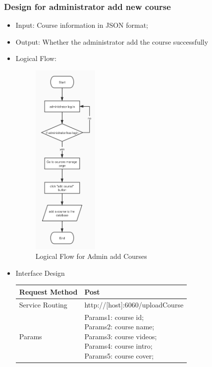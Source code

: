 \documentclass[16pt]{scrreprt}
\begin{document}
\subsubsection{Design for administrator add new course}
\begin{itemize}
    \item Input: Course information in JSON format; 
    \item Output: Whether the administrator add the course successfully
    \item Logical Flow:
     \begin{figure}[H]
    \centering
    \includegraphics[width=0.3\textwidth]{diagrams/admin-add-course.jpg}
    \caption{Logical Flow for Admin add Courses}
\end{figure}
    \item Interface Design
    \begin{center}
    \begin{tabular}{p{5cm}p{10cm}}
        \hline
        Request Method & Post\\
        \hline
        Service Routing &  http://[host]:6060/uploadCourse\\
        \hline
        Params & \makecell[l]{Params1: course id;\\Params2: course name;\\Params3: course videos;\\Params4: course intro;\\Params5: course cover;\\ }\\ 

\end{tabular}
\end{center}
\end{itemize}
\end{document}
